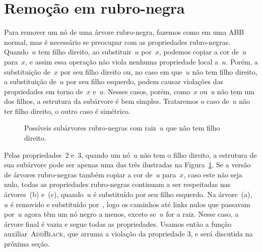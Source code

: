 \documentclass[main.tex]{subfiles}
\begin{document}
\section{Remoção em rubro-negra}

Para remover um nó de uma árvore rubro-negra, fazemos como em uma ABB normal, mas é necessário se preocupar com as propriedades rubro-negras. Quando~$u$ tem filho direito, ao substituir~$u$ por~$x$, podemos copiar a cor de~$u$ para~$x$, e assim essa operação não viola nenhuma propriedade local a~$u$. Porém, a substituição de~$x$ por seu filho direito ou, no caso em que~$u$ não tem filho direito, a substituição de~$u$ por seu filho esquerdo, podem causar violações das propriedades em torno de~$x$ e~$u$. Nesses casos, porém, como~$x$ ou~$u$ não tem um dos filhos, a estrutura da subárvore é bem simples. Trataremos o caso de~$u$ não ter filho direito, o outro caso é simétrico.

\begin{figure}
\centering
{}
\caption{Possíveis subárvores rubro-negras com raiz~$u$ que não tem filho direito.} \label{fig:rbnorchild}
\end{figure}

Pelas propriedades~2 e~3, quando um nó~$u$ não tem o filho direito, a estrutura de sua subárvore pode ser apenas uma das três ilustradas na Figura~\ref{fig:rbnorchild}.
Se a versão~ de árvores rubro-negras também copiar a cor de~$u$ para~$x$, caso este não seja nulo, todas as propriedades rubro-negras continuam a ser respeitadas nas árvores~(b) e~(c), quando~$u$ é substituído por seu filho esquerdo. Na árvore~(a),~$u$ é removido e substituído por~, logo os caminhos até links nulos que passavam por~$u$ agora têm um nó negro a menos, exceto se~$u$ for a raiz. Nesse caso, a árvore final é vazia e segue todas as propriedades.
Usamos então a função auxiliar~\textsc{AddBlack}, que arruma a violação da propriedade 3, e será discutida na próxima seção.
\end{document}
